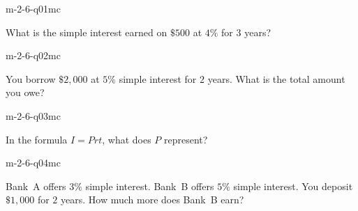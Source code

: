 

\begin{practiceQuestion}{m-2-6-q01}{mc}
\begin{questionText}
What is the simple interest earned on $\$500$ at $4\%$ for $3$ years?
\end{questionText}
\end{practiceQuestion}

\begin{practiceQuestion}{m-2-6-q02}{mc}
\begin{questionText}
You borrow $\$2{,}000$ at $5\%$ simple interest for $2$ years. What is the total amount you owe?
\end{questionText}
\end{practiceQuestion}

\begin{practiceQuestion}{m-2-6-q03}{mc}
\begin{questionText}
In the formula $I = Prt$, what does $P$ represent?
\end{questionText}
\end{practiceQuestion}

\begin{practiceQuestion}{m-2-6-q04}{mc}
\begin{questionText}
Bank~A offers $3\%$ simple interest. Bank~B offers $5\%$ simple interest. You deposit $\$1{,}000$ for $2$ years. How much more does Bank~B earn?
\end{questionText}
\end{practiceQuestion}

